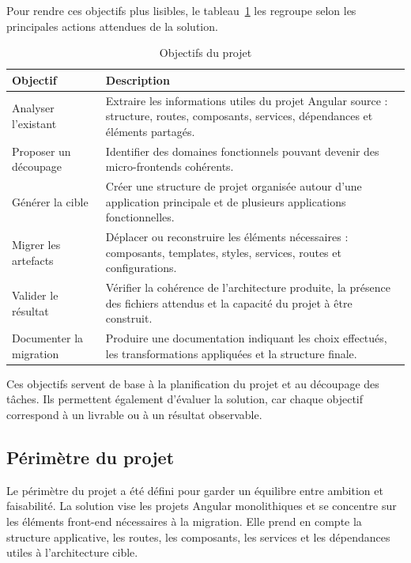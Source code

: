 Pour rendre ces objectifs plus lisibles, le tableau~\ref{tab:objectifs-projet} les regroupe selon les principales actions attendues de la solution.

\begingroup
\renewcommand{\arraystretch}{1.25}
\begin{longtable}{|p{3.3cm}|p{10.7cm}|}
\caption{Objectifs du projet}\label{tab:objectifs-projet}\\
\hline
\textbf{Objectif} & \textbf{Description} \\
\hline
Analyser l'existant & Extraire les informations utiles du projet Angular source : structure, routes, composants, services, dépendances et éléments partagés. \\
\hline
Proposer un découpage & Identifier des domaines fonctionnels pouvant devenir des micro-frontends cohérents. \\
\hline
Générer la cible & Créer une structure de projet organisée autour d'une application principale et de plusieurs applications fonctionnelles. \\
\hline
Migrer les artefacts & Déplacer ou reconstruire les éléments nécessaires : composants, templates, styles, services, routes et configurations. \\
\hline
Valider le résultat & Vérifier la cohérence de l'architecture produite, la présence des fichiers attendus et la capacité du projet à être construit. \\
\hline
Documenter la migration & Produire une documentation indiquant les choix effectués, les transformations appliquées et la structure finale. \\
\hline
\end{longtable}
\endgroup

Ces objectifs servent de base à la planification du projet et au découpage des tâches. Ils permettent également d'évaluer la solution, car chaque objectif correspond à un livrable ou à un résultat observable.

\subsection{Périmètre du projet}

Le périmètre du projet a été défini pour garder un équilibre entre ambition et faisabilité. La solution vise les projets Angular monolithiques et se concentre sur les éléments front-end nécessaires à la migration. Elle prend en compte la structure applicative, les routes, les composants, les services et les dépendances utiles à l'architecture cible.

